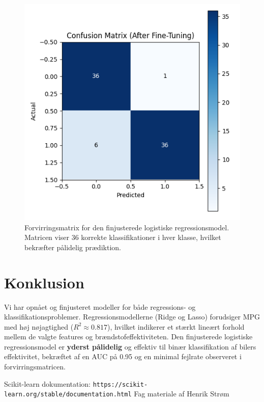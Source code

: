 \documentclass{article}
\begin{document}
\begin{figure}[h]
    \centering
    \includegraphics[width=0.6\columnwidth]{../models/confusion_matrix_after_finetuning.png}
    \caption{Forvirringsmatrix for den finjusterede logistiske regressionsmodel. Matricen viser 36 korrekte klassifikationer i hver klasse, hvilket bekræfter pålidelig prædiktion.}
    \label{fig:cm}
\end{figure}

\section{Konklusion}

Vi har opnået og finjusteret modeller for både regressions- og klassifikationsproblemer. Regressionsmodellerne (Ridge og Lasso) forudsiger MPG med høj nøjagtighed ($R^2 \approx 0.817$), hvilket indikerer et stærkt lineært forhold mellem de valgte features og brændstofeffektiviteten. Den finjusterede logistiske regressionsmodel er \textbf{yderst pålidelig} og effektiv til binær klassifikation af bilers effektivitet, bekræftet af en AUC på 0.95 og en minimal fejlrate observeret i forvirringsmatricen.



Scikit-learn dokumentation: \texttt{https://scikit-learn.org/stable/documentation.html}
Fag materiale af Henrik Strøm
\end{document}
